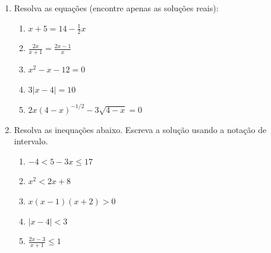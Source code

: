 \documentclass[a4paper,5pt]{amsbook}
\newcommand{\ds}{\displaystyle}
\begin{document}
\vspace{1cm}
\begin{enumerate}
    \vspace{0.5cm}
    \item Resolva as equa\c{c}\~oes (encontre apenas as solu\c{c}\~oes reais):
        \begin{enumerate}
            \vspace{0.3cm}
            \item $\ds x+5=14-\frac{1}{2}x$
            \vspace{0.3cm}
            \item $\ds\frac{2x}{x+1}=\frac{2x-1}{x}$
            \vspace{0.3cm}
            \item $\ds x^2-x-12=0$
            \vspace{0.3cm}
            \item $\ds 3|x-4|=10$
            \vspace{0.3cm}
            \item $2x{(4-x)}^{-1/2}-3\sqrt{4-x}=0$
        \end{enumerate}

    \vspace{0.5cm}
    \item Resolva as inequa\c{c}\~oes abaixo. Escreva a solu\c{c}\~ao usando a nota\c{c}\~ao de intervalo.
        \begin{enumerate}
            \vspace{0.3cm}
            \item $-4<5-3x\le17$
            \vspace{0.3cm}
            \item $x^2<2x+8$
            \vspace{0.3cm}
            \item $x(x-1)(x+2)>0$
            \vspace{0.3cm}
            \item $|x-4|<3$
            \vspace{0.3cm}
            \item $\ds\frac{2x-3}{x+1}\le 1$
        \end{enumerate}
\end{enumerate}
\end{document}
